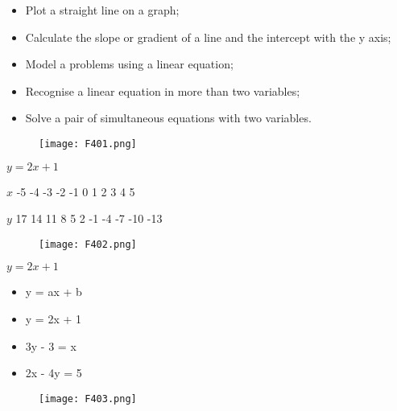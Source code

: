 \begin{frame}
\begin{itemize}
  \item Plot a straight line on a graph;
  \item Calculate the slope or gradient of a line and the intercept with the y axis;
  \item Model a problems using a linear equation;
  \item Recognise a linear equation in more than two variables;
  \item Solve a pair of simultaneous equations with two variables.
\end{itemize}
\end{frame}
\begin{frame}
\vspace*{1.2cm}
  \begin{figure}
    \centering
    \texttt{[image: F401.png]} %
  \end{figure}
  $y = 2x + 1$
\end{frame}
\begin{frame}
$x$  -5   -4   -3  -2  -1   0   1   2   3     4    5

$y$ 17  14  11   8   5   2  -1  -4  -7  -10  -13


  \begin{figure}
    \centering
    \texttt{[image: F402.png]} %
  \end{figure}
  $y = 2x + 1$
\end{frame}
\begin{frame}
\begin{itemize}
  \item y = ax + b
  \vspace*{.35mm}
  \item y = 2x + 1
  \item 3y - 3 = x
  \item 2x - 4y = 5
\end{itemize}
  \begin{figure}
    \centering
    \texttt{[image: F403.png]} %
  \end{figure}
\end{frame}
